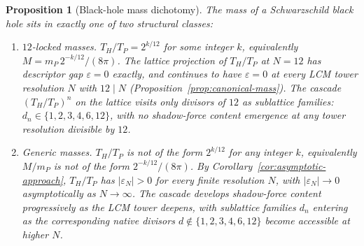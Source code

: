 \documentclass[11pt,a4paper]{article}
\newtheorem{proposition}[theorem]{Proposition}
\theoremstyle{definition}
\theoremstyle{remark}
\begin{document}
\begin{proposition}[Black-hole mass dichotomy]\label{prop:BH-dichotomy}
The mass of a Schwarzschild black hole sits in exactly one of two structural classes:
\begin{enumerate}[label=(\roman*),leftmargin=*]
\item \emph{$12$-locked masses.} $T_{H}/T_{P} = 2^{k/12}$ for some integer $k$, equivalently $M = m_{P}\,2^{-k/12}/(8\pi)$. The lattice projection of $T_{H}/T_{P}$ at $N=12$ has descriptor gap $\varepsilon = 0$ exactly, and continues to have $\varepsilon = 0$ at every LCM tower resolution $N$ with $12 \mid N$ (Proposition~\ref{prop:canonical-mass}). The cascade $(T_{H}/T_{P})^{n}$ on the lattice visits only divisors of $12$ as sublattice families: $d_{n} \in \{1,2,3,4,6,12\}$, with no shadow-force content emergence at any tower resolution divisible by $12$.
\item \emph{Generic masses.} $T_{H}/T_{P}$ is not of the form $2^{k/12}$ for any integer $k$, equivalently $M/m_{P}$ is not of the form $2^{-k/12}/(8\pi)$. By Corollary~\ref{cor:asymptotic-approach}, $T_{H}/T_{P}$ has $|\varepsilon_{N}| > 0$ for every finite resolution $N$, with $|\varepsilon_{N}| \to 0$ asymptotically as $N \to \infty$. The cascade develops shadow-force content progressively as the LCM tower deepens, with sublattice families $d_{n}$ entering as the corresponding native divisors $d \notin \{1,2,3,4,6,12\}$ become accessible at higher $N$.
\end{enumerate}
\end{proposition}
\end{document}
